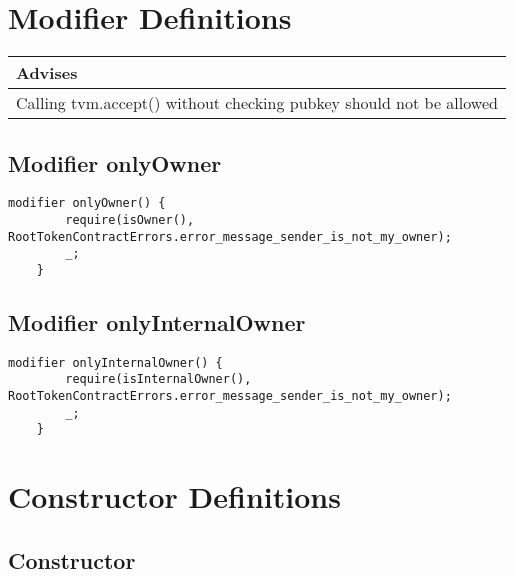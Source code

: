 \section{Modifier Definitions}


\ifsoldraft
\noindent\begin{tabular}{|p{12cm}|}\hline
\rowcolor{green}Advises
\\\hline
Calling tvm.accept() without checking pubkey should not be allowed
\\\hline\end{tabular}
\fi

\subsection{Modifier onlyOwner}


\begin{lstlisting}[firstnumber=458]
    modifier onlyOwner() {
        require(isOwner(), RootTokenContractErrors.error_message_sender_is_not_my_owner);
        _;
    }
\end{lstlisting}

\subsection{Modifier onlyInternalOwner}


\begin{lstlisting}[firstnumber=463]
    modifier onlyInternalOwner() {
        require(isInternalOwner(), RootTokenContractErrors.error_message_sender_is_not_my_owner);
        _;
    }
\end{lstlisting}

\section{Constructor Definitions}


\subsection{Constructor}


